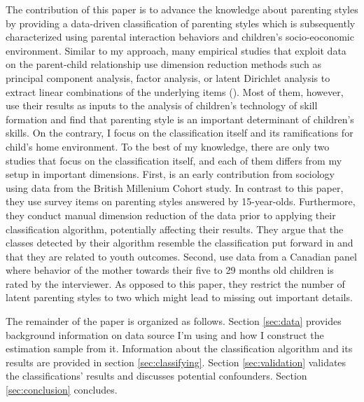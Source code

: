 
The contribution of this paper is to advance the knowledge about parenting styles by providing a data-driven classification of parenting styles which is subsequently characterized using parental interaction behaviors and children's socio-eoconomic environment. Similar to my approach, many empirical studies that exploit data on the parent-child relationship use dimension reduction methods such as principal component analysis, factor analysis, or latent Dirichlet analysis to extract linear combinations of the underlying items (\cite{ermischOriginsSocialImmobility2008, chanParentingStyleYouth2011, fioriniHowAllocationChildren2014, bonoEarlyMaternalTime2016, cobb-clarkParentingStyleInvestment2019, zumbuehlParentalInvolvementIntergenerational2020, rauhParentingTypes2020}). Most of them, however, use their results as inputs to the analysis of children's technology of skill formation and find that parenting style is an important determinant of children's skills. On the contrary, I focus on the classification itself and its ramifications for child's home environment. To the best of my knowledge, there are only two studies that focus on the classification itself, and each of them differs from my setup in important dimensions. First, \textcite{chanParentingStyleYouth2011} is an early contribution from sociology using data from the British Millenium Cohort study. In contrast to this paper, they use survey items on parenting styles answered by 15-year-olds. Furthermore, they conduct manual dimension reduction of the data prior to applying their classification algorithm, potentially affecting their results. They argue that the classes detected by their algorithm resemble the classification put forward in \textcite{baumrindChildCarePractices1967} and that they are related to youth outcomes. Second, \textcite{rauhParentingTypes2020} use data from a Canadian panel where behavior of the mother towards their five to 29 months old children is rated by the interviewer. As opposed to this paper, they restrict the number of latent parenting styles to two which might lead to missing out important details.

The remainder of the paper is organized as follows. Section \ref{sec:data} provides background information on data source I'm using and how I construct the estimation sample from it. Information about the classification algorithm and its results are provided in section \ref{sec:classifying}. Section \ref{sec:validation} validates the classifications' results and discusses potential confounders. Section \ref{sec:conclusion} concludes.


